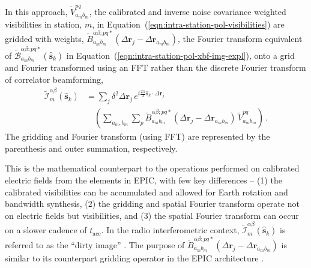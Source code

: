 \documentclass[
  journal=pasa,
  manuscript=article-type,
  year=2020,
  volume=37,
]{cup-journal}
\begin{document}
In this approach, $\widetilde{V}_{a_m b_m}^{pq}$, the calibrated and inverse noise covariance weighted visibilities in station, $m$, in Equation~(\ref{eqn:intra-station-pol-visibilities}) are gridded with weights, $\widetilde{B}_{a_m b_m}^{\alpha\beta;pq*}(\Delta\boldsymbol{r}_j-\Delta\boldsymbol{r}_{a_m b_m})$, the Fourier transform equivalent of $\widetilde{\mathcal{B}}_{a_m b_m}^{\alpha\beta;pq*}(\hat{\boldsymbol{s}}_k)$ in Equation~(\ref{eqn:intra-station-pol-xbf-img-expl}), onto a grid and Fourier transformed using an FFT rather than the discrete Fourier transform of correlator beamforming,
\begin{align}
  \widetilde{\mathcal{I}}_m^{\alpha\beta}(\hat{\boldsymbol{s}}_k) &= \sum_j \delta^2 \Delta\boldsymbol{r}_j \, e^{i\frac{2\pi}{\lambda} \hat{\boldsymbol{s}}_k\cdot\Delta\boldsymbol{r}_j} \nonumber\\
  &\quad \left(\sum_{a_m,b_m} \sum_p \widetilde{B}_{a_m b_m}^{\alpha\beta;pq*}(\Delta\boldsymbol{r}_j-\Delta\boldsymbol{r}_{a_m b_m}) \, \widetilde{V}_{a_m b_m}^{pq} \right) \, . \label{eqn:intra-station-pol-img-xfft-expl}
\end{align}
The gridding and Fourier transform (using FFT) are represented by the parenthesis and outer summation, respectively. 

This is the mathematical counterpart to the operations performed on calibrated electric fields from the elements in EPIC, with few key differences -- (1) the calibrated visibilities can be accumulated and allowed for Earth rotation and bandwidth synthesis, (2) the gridding and spatial Fourier transform operate not on electric fields but visibilities, and (3) the spatial Fourier transform can occur on a slower cadence of $t_\textrm{acc}$.
In the radio interferometric context, $\widetilde{\mathcal{I}}_m^{\alpha\beta}(\hat{\boldsymbol{s}}_k)$ is referred to as the ``dirty image'' \citep{TMS2017,SIRA-II}. The purpose of $\widetilde{B}_{a_m b_m}^{\alpha\beta;pq*}(\Delta\boldsymbol{r}_j-\Delta\boldsymbol{r}_{a_m b_m})$ is similar \citep{Morales+2009,Bhatnagar+2008,Cornwell+2008} to its counterpart gridding operator in the EPIC architecture \citep{Morales2011}. 
\end{document}
